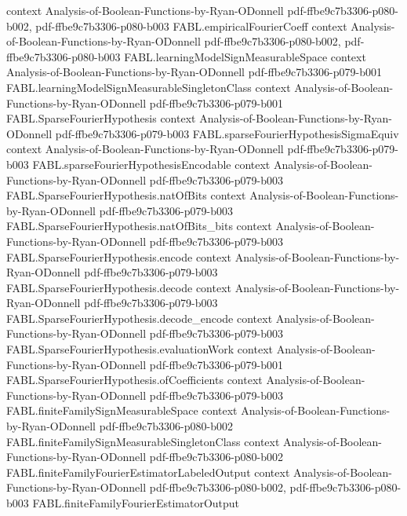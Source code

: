 \begin{theorem}
  {context}
  {Analysis-of-Boolean-Functions-by-Ryan-ODonnell}
  {pdf-ffbe9c7b3306-p080-b002,
    pdf-ffbe9c7b3306-p080-b003}
\proofstep
  {FABL.empiricalFourierCoeff}
  {context}
  {Analysis-of-Boolean-Functions-by-Ryan-ODonnell}
  {pdf-ffbe9c7b3306-p080-b002,
    pdf-ffbe9c7b3306-p080-b003}
\proofstep
  {FABL.learningModelSignMeasurableSpace}
  {context}
  {Analysis-of-Boolean-Functions-by-Ryan-ODonnell}
  {pdf-ffbe9c7b3306-p079-b001}
\proofstep
  {FABL.learningModelSignMeasurableSingletonClass}
  {context}
  {Analysis-of-Boolean-Functions-by-Ryan-ODonnell}
  {pdf-ffbe9c7b3306-p079-b001}
\proofstep
  {FABL.SparseFourierHypothesis}
  {context}
  {Analysis-of-Boolean-Functions-by-Ryan-ODonnell}
  {pdf-ffbe9c7b3306-p079-b003}
\proofstep
  {FABL.sparseFourierHypothesisSigmaEquiv}
  {context}
  {Analysis-of-Boolean-Functions-by-Ryan-ODonnell}
  {pdf-ffbe9c7b3306-p079-b003}
\proofstep
  {FABL.sparseFourierHypothesisEncodable}
  {context}
  {Analysis-of-Boolean-Functions-by-Ryan-ODonnell}
  {pdf-ffbe9c7b3306-p079-b003}
\proofstep
  {FABL.SparseFourierHypothesis.natOfBits}
  {context}
  {Analysis-of-Boolean-Functions-by-Ryan-ODonnell}
  {pdf-ffbe9c7b3306-p079-b003}
\proofstep
  {FABL.SparseFourierHypothesis.natOfBits_bits}
  {context}
  {Analysis-of-Boolean-Functions-by-Ryan-ODonnell}
  {pdf-ffbe9c7b3306-p079-b003}
\proofstep
  {FABL.SparseFourierHypothesis.encode}
  {context}
  {Analysis-of-Boolean-Functions-by-Ryan-ODonnell}
  {pdf-ffbe9c7b3306-p079-b003}
\proofstep
  {FABL.SparseFourierHypothesis.decode}
  {context}
  {Analysis-of-Boolean-Functions-by-Ryan-ODonnell}
  {pdf-ffbe9c7b3306-p079-b003}
\proofstep
  {FABL.SparseFourierHypothesis.decode_encode}
  {context}
  {Analysis-of-Boolean-Functions-by-Ryan-ODonnell}
  {pdf-ffbe9c7b3306-p079-b003}
\proofstep
  {FABL.SparseFourierHypothesis.evaluationWork}
  {context}
  {Analysis-of-Boolean-Functions-by-Ryan-ODonnell}
  {pdf-ffbe9c7b3306-p079-b001}
\proofstep
  {FABL.SparseFourierHypothesis.ofCoefficients}
  {context}
  {Analysis-of-Boolean-Functions-by-Ryan-ODonnell}
  {pdf-ffbe9c7b3306-p079-b003}
\proofstep
  {FABL.finiteFamilySignMeasurableSpace}
  {context}
  {Analysis-of-Boolean-Functions-by-Ryan-ODonnell}
  {pdf-ffbe9c7b3306-p080-b002}
\proofstep
  {FABL.finiteFamilySignMeasurableSingletonClass}
  {context}
  {Analysis-of-Boolean-Functions-by-Ryan-ODonnell}
  {pdf-ffbe9c7b3306-p080-b002}
\proofstep
  {FABL.finiteFamilyFourierEstimatorLabeledOutput}
  {context}
  {Analysis-of-Boolean-Functions-by-Ryan-ODonnell}
  {pdf-ffbe9c7b3306-p080-b002,
    pdf-ffbe9c7b3306-p080-b003}
\proofstep
  {FABL.finiteFamilyFourierEstimatorOutput}

\end{theorem}
